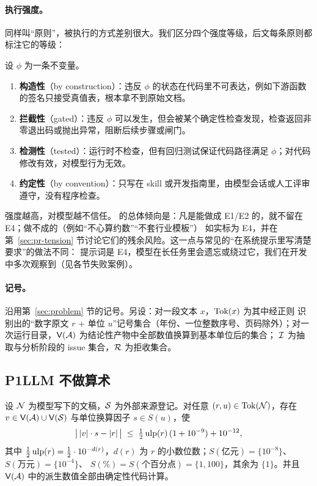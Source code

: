 \paragraph{执行强度。}同样叫“原则”，被执行的方式差别很大。我们区分四个强度等级，后文每条原则都标注它的等级：

\begin{definition}[执行强度]\label{def:pr-strength}
设 $\phi$ 为一条不变量。
\begin{enumerate}
  \item[\textbf{E1}] \textbf{构造性}（by construction）：违反 $\phi$ 的状态在代码里不可表达，例如下游函数的签名只接受真值表，根本拿不到原始文档。
  \item[\textbf{E2}] \textbf{拦截性}（gated）：违反 $\phi$ 可以发生，但会被某个确定性检查发现，检查返回非零退出码或抛出异常，阻断后续步骤或闸门。
  \item[\textbf{E3}] \textbf{检测性}（tested）：运行时不检查，但有回归测试保证代码路径满足 $\phi$；对代码修改有效，对模型行为无效。
  \item[\textbf{E4}] \textbf{约定性}（by convention）：只写在 skill 或开发指南里，由模型会话或人工评审遵守，没有程序检查。
\end{enumerate}
\end{definition}

强度越高，对模型越不信任。\sysname{} 的总体倾向是：凡是能做成 E1/E2 的，就不留在 E4；做不成的（例如“不心算约数”“不套行业模板”）
如实标为 E4，并在第~\ref{sec:pr-tension} 节讨论它们的残余风险。这一点与常见的“在系统提示里写清楚要求”的做法不同：
提示词是 E4，模型在长任务里会遗忘或绕过它，我们在开发中多次观察到（见各节失败案例）。

\paragraph{记号。}沿用第~\ref{sec:problem} 节的记号。另设：对一段文本 $x$，$\operatorname{Tok}(x)$ 为其中经正则 
识别出的“数字原文 $r$ + 单位 $u$”记号集合（年份、一位整数序号、页码除外）；对一次运行目录，$\mathsf{V}(\mathcal{A})$ 为结论性产物中全部数值换算到基本单位后的集合；
$\mathcal{I}$ 为抽取与分析阶段的 issue 集合，$\mathcal{R}$ 为拒收集合。

\subsection{P1\quad LLM 不做算术}
\label{sec:pr-p1}

\begin{invariant}[无模型算术]\label{inv:pr-arith}
设 $\mathcal{N}$ 为模型写下的文稿，$\mathcal{S}$ 为外部来源登记。对任意 $(r,u)\in\operatorname{Tok}(\mathcal{N})$，存在
$v\in\mathsf{V}(\mathcal{A})\cup\mathsf{V}(\mathcal{S})$ 与单位换算因子 $s\in S(u)$，使
\begin{equation}
  \bigl|\,|v|\cdot s - |r|\,\bigr| \;\le\; \tfrac12\operatorname{ulp}(r)\,(1+10^{-9}) + 10^{-12},
  \label{eq:pr-found}
\end{equation}
其中 $\tfrac12\operatorname{ulp}(r)=\tfrac12\cdot 10^{-d(r)}$，$d(r)$ 为 $r$ 的小数位数；$S(\text{亿元})=\{10^{-8}\}$、$S(\text{万元})=\{10^{-4}\}$、
$S(\%)=S(\text{个百分点})=\{1,100\}$，其余为 $\{1\}$。并且 $\mathsf{V}(\mathcal{A})$ 中的派生数值全部由确定性代码计算。
\end{invariant}

